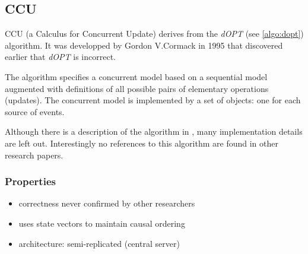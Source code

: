 \subsection{CCU}
\label{algo:ccu}

CCU (a Calculus for Concurrent Update) derives from the \emph{dOPT} (see \ref{algo:dopt}) algorithm. It was developped by Gordon V.Cormack in 1995 that discovered earlier \cite{cormack95a} that \emph{dOPT} is incorrect. 

The algorithm specifies a concurrent model based on a sequential model augmented with definitions of all possible pairs of elementary operations (updates). The concurrent model is implemented by a set of objects: one for each source of events.

Although there is a description of the algorithm in \cite{cormack95b}, many implementation details are left out. Interestingly no references to this algorithm are found in other research papers.

\subsubsection{Properties}
\begin{itemize}
 \item correctness never confirmed by other researchers
 \item uses state vectors to maintain causal ordering
 \item architecture: semi-replicated (central server)
\end{itemize}
